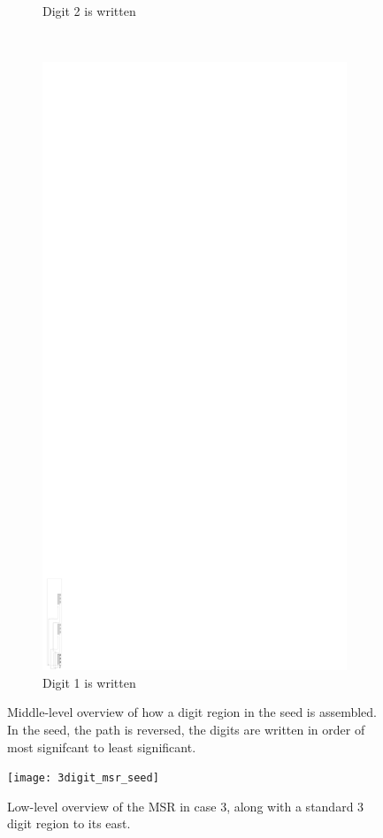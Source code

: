 \documentclass[10pt]{article}
\begin{document}
\begin{figure}
\begin{subfigure}[t]{0.23\textwidth}
        \caption{\label{fig:mid_level_timeline_phase_3} Digit 2 is written }
    \end{subfigure}%
    ~
    \begin{subfigure}[t]{0.23\textwidth}
        \centering
        \includegraphics[width=.85in,valign=t]{mid_level_timeline_phase_4}
        \caption{\label{fig:mid_level_timeline_phase_4} Digit 1 is written }
    \end{subfigure}

    \caption{\label{fig:mid_level_timeline_overview} Middle-level overview of how a digit region in the seed is assembled. In the seed, the path is reversed, the digits are written in order of most signifcant to least significant. }
\end{figure}


\begin{figure}
    \centering

    \texttt{[image: 3digit\_msr\_seed]}

    \caption{\label{fig:3digit_msr_seed} Low-level overview of the MSR in case 3, along with a standard 3 digit region to its east.}
\end{figure}
\end{document}

